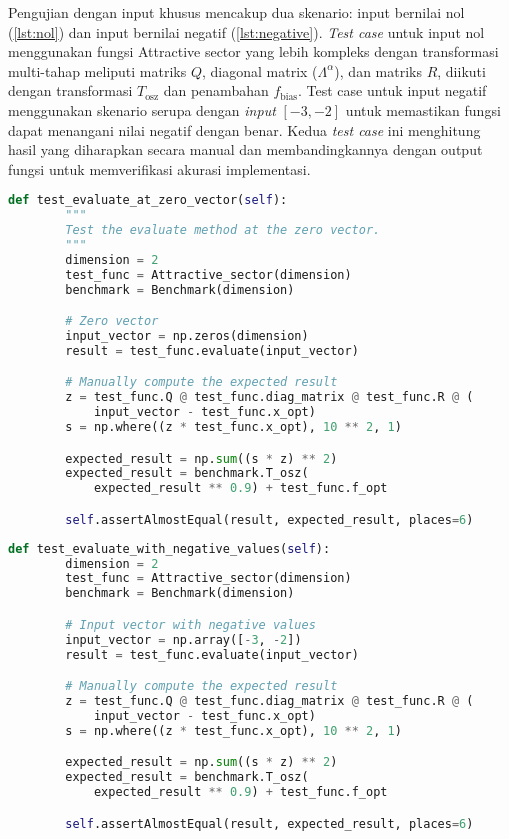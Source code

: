 Pengujian dengan input khusus mencakup dua skenario: input bernilai nol (\cref{lst:nol}) dan input bernilai negatif (\cref{lst:negative}). \textit{Test case} untuk input nol menggunakan fungsi Attractive sector yang lebih kompleks dengan transformasi multi-tahap meliputi matriks $Q$, diagonal matrix ($\Lambda^{\alpha}$), dan matriks $R$, diikuti dengan transformasi $T_{\text{osz}}$ dan penambahan $f_{\text{bias}}$. Test case untuk input negatif menggunakan skenario serupa dengan \textit{input} $[-3, -2]$ untuk memastikan fungsi dapat menangani nilai negatif dengan benar. Kedua \textit{test case} ini menghitung hasil yang diharapkan secara manual dan membandingkannya dengan output fungsi untuk memverifikasi akurasi implementasi.
\begin{lstlisting}[language=Python, caption=\textit{Test case} dengan input bernilai nol, label=lst:nol]
    def test_evaluate_at_zero_vector(self):
        """
        Test the evaluate method at the zero vector.
        """
        dimension = 2
        test_func = Attractive_sector(dimension)
        benchmark = Benchmark(dimension)

        # Zero vector
        input_vector = np.zeros(dimension)
        result = test_func.evaluate(input_vector)

        # Manually compute the expected result
        z = test_func.Q @ test_func.diag_matrix @ test_func.R @ (
            input_vector - test_func.x_opt)
        s = np.where((z * test_func.x_opt), 10 ** 2, 1)

        expected_result = np.sum((s * z) ** 2)
        expected_result = benchmark.T_osz(
            expected_result ** 0.9) + test_func.f_opt

        self.assertAlmostEqual(result, expected_result, places=6)
\end{lstlisting}
\begin{lstlisting}[language=Python, caption=\textit{Test case} dengan input bernilai negatif, label=lst:negative]
    def test_evaluate_with_negative_values(self):
        dimension = 2
        test_func = Attractive_sector(dimension)
        benchmark = Benchmark(dimension)

        # Input vector with negative values
        input_vector = np.array([-3, -2])
        result = test_func.evaluate(input_vector)

        # Manually compute the expected result
        z = test_func.Q @ test_func.diag_matrix @ test_func.R @ (
            input_vector - test_func.x_opt)
        s = np.where((z * test_func.x_opt), 10 ** 2, 1)

        expected_result = np.sum((s * z) ** 2)
        expected_result = benchmark.T_osz(
            expected_result ** 0.9) + test_func.f_opt

        self.assertAlmostEqual(result, expected_result, places=6)
\end{lstlisting}

